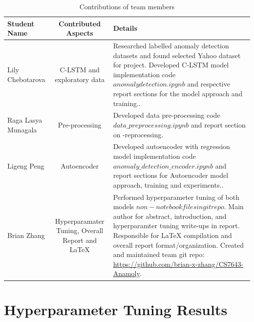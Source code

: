\documentclass[10pt,twocolumn,letterpaper]{article}
\begin{document}
\newpage
\onecolumn
\begin{appendices}

   \begin{table}
   \begin{tabular}{|l|c|p{6cm}|}
   \hline
   Student Name & Contributed Aspects & Details \\
   \hline\hline
   Lily Chebotarova            & C-LSTM and exploratory data  & Researched labelled anomaly detection datasets and found selected Yahoo dataset for project. Developed C-LSTM model implementation code \(anomalydetection.ipynb\) and respective report sections for the model approach and training.. \\ \hline 
   Raga Lasya Munagala         & Pre-processing & Developed data pre-processing code \(data\_preprocessing.ipynb\) and report section on -reprocessing. \\ \hline
   Ligeng Peng                 & Autoencoder  & Developed autoencoder with regression model implementation code \(anomaly\_detection\_encoder.ipynb\) and report sections for Autoencoder model  approach, training and experiments.. \\ \hline
   Brian Zhang                 & Hyperparamater Tuning, Overall Report and LaTeX  & Performed hyperparameter tuning of both models \(non-notebook files in git repo\). Main author for abstract, introduction, and hyperparamter tuning write-ups in report. Responsible for LaTeX compilation and overall report format/organization. Created and maintained team git repo: \url{https://github.com/brian-x-zhang/CS7643-Anamoly}. \\ \hline
   \hline
   \end{tabular}
   \caption{Contributions of team members}
   \label{tab:contributions}
   \end{table}


\section{Hyperparameter Tuning Results}
   \tiny{

}
\end{appendices}
\end{document}
